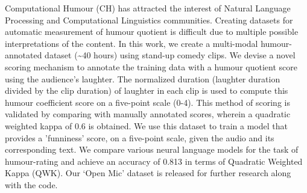 Computational Humour (CH) has attracted the interest of Natural Language Processing and Computational Linguistics communities. Creating datasets for automatic measurement of humour quotient is difficult due to multiple possible interpretations of the content. In this work, we create a multi-modal humour-annotated dataset ({\textasciitilde}40 hours) using stand-up comedy clips. We devise a novel scoring mechanism to annotate the training data with a humour quotient score using the audience's laughter. The normalized duration (laughter duration divided by the clip duration) of laughter in each clip is used to compute this humour coefficient score on a five-point scale (0-4). This method of scoring is validated by comparing with manually annotated scores, wherein a quadratic weighted kappa of 0.6 is obtained. We use this dataset to train a model that provides a 'funniness' score, on a five-point scale, given the audio and its corresponding text. We compare various neural language models for the task of humour-rating and achieve an accuracy of 0.813 in terms of Quadratic Weighted Kappa (QWK). Our `Open Mic' dataset is released for further research along with the code.
